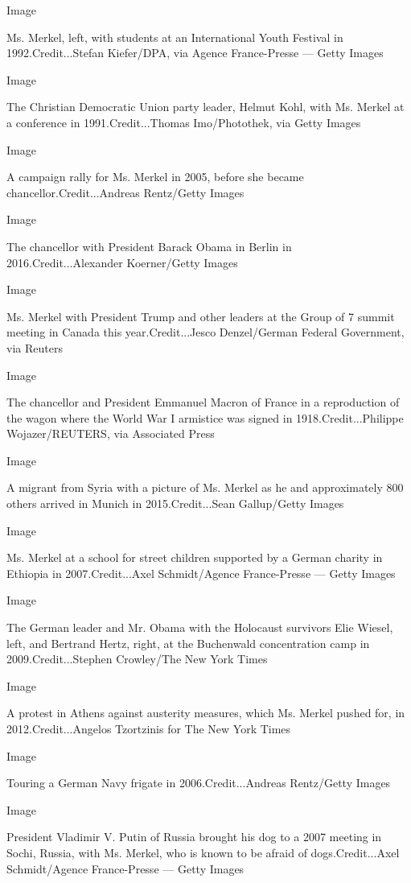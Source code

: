 Image

Ms. Merkel, left, with students at an International Youth Festival in
1992.Credit...Stefan Kiefer/DPA, via Agence France-Presse --- Getty
Images

Image

The Christian Democratic Union party leader, Helmut Kohl, with Ms.
Merkel at a conference in 1991.Credit...Thomas Imo/Photothek, via Getty
Images

Image

A campaign rally for Ms. Merkel in 2005, before she became
chancellor.Credit...Andreas Rentz/Getty Images

Image

The chancellor with President Barack Obama in Berlin in
2016.Credit...Alexander Koerner/Getty Images

Image

Ms. Merkel with President Trump and other leaders at the Group of 7
summit meeting in Canada this year.Credit...Jesco Denzel/German Federal
Government, via Reuters

Image

The chancellor and President Emmanuel Macron of France in a reproduction
of the wagon where the World War I armistice was signed in
1918.Credit...Philippe Wojazer/REUTERS, via Associated Press

Image

A migrant from Syria with a picture of Ms. Merkel as he and
approximately 800 others arrived in Munich in 2015.Credit...Sean
Gallup/Getty Images

Image

Ms. Merkel at a school for street children supported by a German charity
in Ethiopia in 2007.Credit...Axel Schmidt/Agence France-Presse --- Getty
Images

Image

The German leader and Mr. Obama with the Holocaust survivors Elie
Wiesel, left, and Bertrand Hertz, right, at the Buchenwald concentration
camp in 2009.Credit...Stephen Crowley/The New York Times

Image

A protest in Athens against austerity measures, which Ms. Merkel pushed
for, in 2012.Credit...Angelos Tzortzinis for The New York Times

Image

Touring a German Navy frigate in 2006.Credit...Andreas Rentz/Getty
Images

Image

President Vladimir V. Putin of Russia brought his dog to a 2007 meeting
in Sochi, Russia, with Ms. Merkel, who is known to be afraid of
dogs.Credit...Axel Schmidt/Agence France-Presse --- Getty Images

